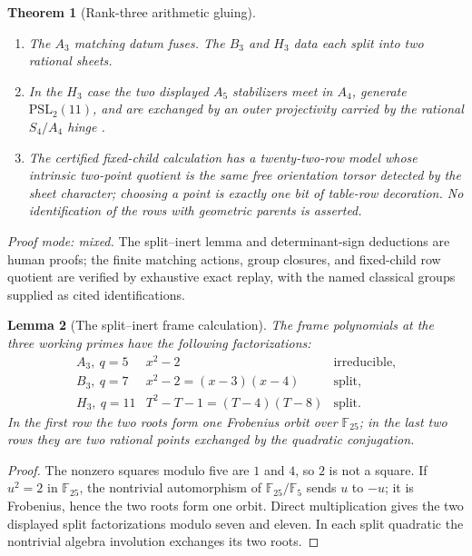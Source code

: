 \documentclass[11pt]{article}
\newtheorem{theorem}{Theorem}[section]
\newtheorem{lemma}[theorem]{Lemma}
\theoremstyle{definition}
\theoremstyle{remark}
\newcommand{\F}{\mathbb{F}}
\begin{document}
\begin{theorem}[Rank-three arithmetic gluing]
\label{thm:headline-gluing}
\begin{enumerate}[label=\textup{(D\arabic*)},leftmargin=*]
\item The $A_3$ matching datum fuses.  The $B_3$ and $H_3$ data each
split into two rational sheets.
\item In the $H_3$ case the two displayed $A_5$ stabilizers meet in
$A_4$, generate $\mathrm{PSL}_2(11)$, and are exchanged by an outer
projectivity carried by the rational $S_4/A_4$ hinge
\cite{Giudici2007,Atlas1985}.
\item The certified fixed-child calculation has a twenty-two-row model whose
intrinsic two-point quotient is the same free orientation torsor detected
by the sheet character; choosing a point is exactly one bit of table-row
decoration.  No identification of the rows with geometric parents is
asserted.
\end{enumerate}
\end{theorem}
\noindent\emph{Proof mode: mixed.}  The split--inert lemma and
determinant-sign deductions are human proofs; the finite matching actions,
group closures, and fixed-child row quotient are verified by exhaustive
exact replay, with
the named classical groups supplied as cited identifications.

\begin{lemma}[The split--inert frame calculation]
\label{lem:rank-three-splitting}
The frame polynomials at the three working primes have the following
factorizations:
\[
\begin{array}{c|c|c}
A_3,\ q=5&x^2-2&\text{irreducible},\\
B_3,\ q=7&x^2-2=(x-3)(x-4)&\text{split},\\
H_3,\ q=11&T^2-T-1=(T-4)(T-8)&\text{split}.
\end{array}
\]
In the first row the two roots form one Frobenius orbit over $\F_{25}$;
in the last two rows they are two rational points exchanged by the
quadratic conjugation.
\end{lemma}

\begin{proof}
The nonzero squares modulo five are $1$ and $4$, so $2$ is not a square.
If $u^2=2$ in $\F_{25}$, the nontrivial automorphism of
$\F_{25}/\F_5$ sends $u$ to $-u$; it is Frobenius, hence the two roots
form one orbit.  Direct multiplication gives the two displayed split
factorizations modulo seven and eleven.  In each split quadratic the
nontrivial algebra involution exchanges its two roots.
\end{proof}
\end{document}
